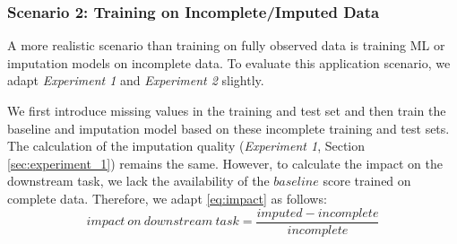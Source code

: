 \subsubsection{Scenario 2: Training on Incomplete/Imputed Data}
\label{sec:scenario_2}
%
A more realistic scenario than training on fully observed data is training ML or imputation models on incomplete data. To evaluate this application scenario, we adapt \emph{Experiment 1} and \emph{Experiment 2} slightly.

We first introduce missing values in the training and test set and then train the baseline and imputation model based on these incomplete training and test sets. The calculation of the imputation quality (\emph{Experiment 1}, Section \ref{sec:experiment_1}) remains the same. However, to calculate the impact on the downstream task, we lack the availability of the $baseline$ score trained on complete data. Therefore, we adapt \autoref{eq:impact} as follows:
%
\begin{equation}
	impact\ on \ downstream\ task = \frac{imputed - incomplete}{incomplete}
	\label{eq:impact_scenario2}
\end{equation}
%
